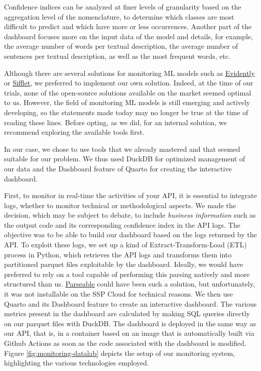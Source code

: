 Confidence indices can be analyzed at finer levels of granularity based on the aggregation level of the nomenclature, to determine which classes are most difficult to predict and which have more or less occurrences. Another part of the dashboard focuses more on the input data of the model and details, for example, the average number of words per textual description, the average number of sentences per textual description, as well as the most frequent words, etc.


Although there are several solutions for monitoring ML models such as \href{https://www.evidentlyai.com/}{Evidently} or \href{https://www.siffletdata.com/}{Sifflet}, we preferred to implement our own solution. Indeed, at the time of our trials, none of the open-source solutions available on the market seemed optimal to us. However, the field of monitoring ML models is still emerging and actively developing, so the statements made today may no longer be true at the time of reading these lines. Before opting, as we did, for an internal solution, we recommend exploring the available tools first.

In our case, we chose to use tools that we already mastered and that seemed suitable for our problem. We thus used DuckDB for optimized management of our data and the Dashboard feature of Quarto for creating the interactive dashboard. 

First, to monitor in real-time the activities of your API, it is essential to integrate logs, whether to monitor technical or methodological aspects. We made the decision, which may be subject to debate, to include \textit{business information} such as the output code and its corresponding confidence index in the API logs. The objective was to be able to build our dashboard based on the logs returned by the API. To exploit these logs, we set up a kind of Extract-Transform-Load (ETL) process in Python, which retrieves the API logs and transforms them into partitioned parquet files exploitable by the dashboard. Ideally, we would have preferred to rely on a tool capable of performing this parsing natively and more structured than us. \href{https://www.parseable.com/}{Parseable} could have been such a solution, but unfortunately, it was not installable on the SSP Cloud for technical reasons. We then use Quarto and its Dashboard feature to create an interactive dashboard. The various metrics present in the dashboard are calculated by making SQL queries directly on our parquet files with DuckDB. The dashboard is deployed in the same way as our API, that is, in a container based on an image that is automatically built via Github Actions as soon as the code associated with the dashboard is modified. Figure \ref{fig:monitoring-datalab} depicts the setup of our monitoring system, highlighting the various technologies employed.

